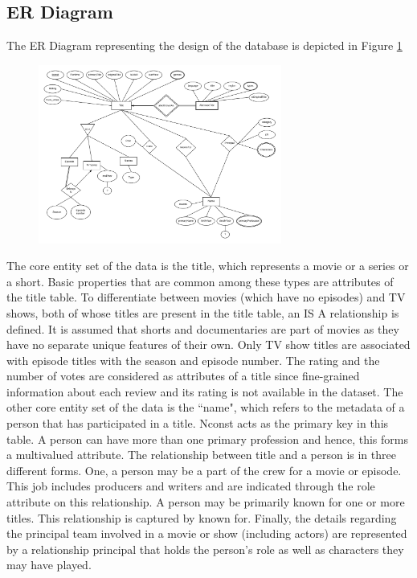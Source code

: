 \documentclass{sig-alternate}
\begin{document}
	\subsection{ER Diagram}
	The ER Diagram representing the design of the database is depicted in Figure \ref{ER}
	\begin{figure}[ht]
		\includegraphics[width=8cm]{er.png}
		\label{ER}
		\centering
	\end{figure}
	The core entity set of the data is the title, which represents a movie or a series or a short. Basic properties that are common among these types are attributes of the title table. To differentiate between movies (which have no episodes) and TV shows, both of whose titles are present in the title table, an IS A relationship is defined. It is assumed that shorts and documentaries are part of movies as they have no separate unique features of their own. Only TV show titles are associated with episode titles with the season and episode number. The rating and the number of votes are considered as attributes of a title since fine-grained information about each review and its rating is not available in the dataset. 
	The other core entity set of the data is the ``name", which refers to the metadata of a person that has participated in a title. Nconst acts as the primary key in this table. 
	A person can have more than one primary profession and hence, this forms a multivalued attribute.
	The relationship between title and a person is in three different forms. One, a person may be a part of the crew for a movie or episode. This job includes producers and writers and are indicated through the role attribute on this relationship. A person may be primarily known for one or more titles. This relationship is captured by known for. Finally, the details regarding the principal team involved in a movie or show (including actors) are represented by a relationship principal that holds the person's role as well as characters they may have played. 
\end{document}

